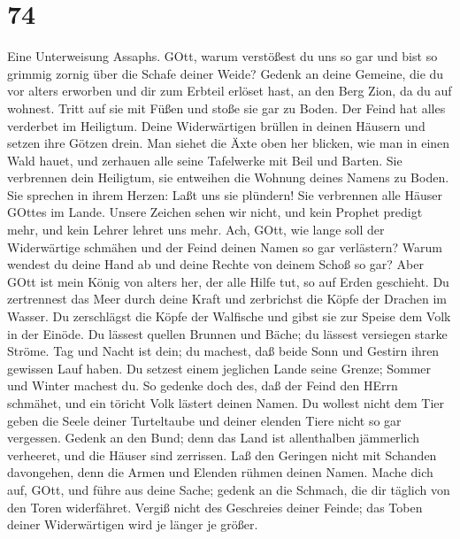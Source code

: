 \hypertarget{section-73}{%
\section{74}\label{section-73}}

 Eine Unterweisung Assaphs. GOtt, warum verstößest du uns so
gar und bist so grimmig zornig über die Schafe deiner Weide?
 Gedenk an deine Gemeine, die du vor alters erworben und dir
zum Erbteil erlöset hast, an den Berg Zion, da du auf wohnest.
 Tritt auf sie mit Füßen und stoße sie gar zu Boden. Der
Feind hat alles verderbet im Heiligtum.  Deine Widerwärtigen
brüllen in deinen Häusern und setzen ihre Götzen drein.  Man
siehet die Äxte oben her blicken, wie man in einen Wald hauet,
 und zerhauen alle seine Tafelwerke mit Beil und Barten.
 Sie verbrennen dein Heiligtum, sie entweihen die Wohnung
deines Namens zu Boden.  Sie sprechen in ihrem Herzen: Laßt
uns sie plündern! Sie verbrennen alle Häuser GOttes im Lande.
 Unsere Zeichen sehen wir nicht, und kein Prophet predigt
mehr, und kein Lehrer lehret uns mehr.  Ach, GOtt, wie
lange soll der Widerwärtige schmähen und der Feind deinen Namen so gar
verlästern?  Warum wendest du deine Hand ab und deine
Rechte von deinem Schoß so gar?  Aber GOtt ist mein König
von alters her, der alle Hilfe tut, so auf Erden geschieht.
 Du zertrennest das Meer durch deine Kraft und zerbrichst
die Köpfe der Drachen im Wasser.  Du zerschlägst die Köpfe
der Walfische und gibst sie zur Speise dem Volk in der Einöde.
 Du lässest quellen Brunnen und Bäche; du lässest versiegen
starke Ströme.  Tag und Nacht ist dein; du machest, daß
beide Sonn und Gestirn ihren gewissen Lauf haben.  Du
setzest einem jeglichen Lande seine Grenze; Sommer und Winter machest
du.  So gedenke doch des, daß der Feind den HErrn schmähet,
und ein töricht Volk lästert deinen Namen.  Du wollest
nicht dem Tier geben die Seele deiner Turteltaube und deiner elenden
Tiere nicht so gar vergessen.  Gedenk an den Bund; denn das
Land ist allenthalben jämmerlich verheeret, und die Häuser sind
zerrissen.  Laß den Geringen nicht mit Schanden davongehen,
denn die Armen und Elenden rühmen deinen Namen.  Mache dich
auf, GOtt, und führe aus deine Sache; gedenk an die Schmach, die dir
täglich von den Toren widerfähret.  Vergiß nicht des
Geschreies deiner Feinde; das Toben deiner Widerwärtigen wird je länger
je größer.

